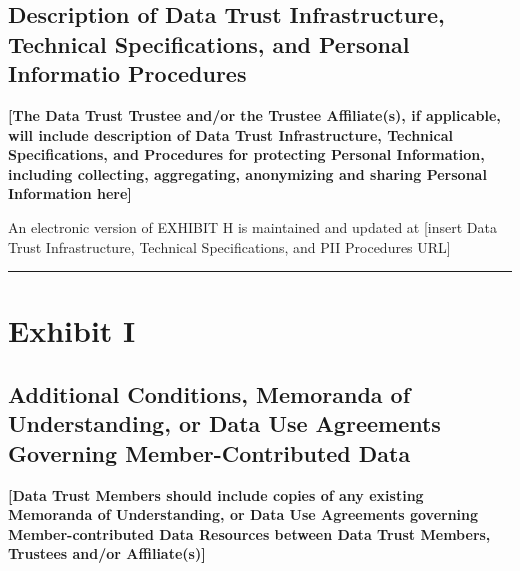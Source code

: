 \documentclass[]{book}
\begin{document}
\hypertarget{description-of-data-trust-infrastructure-technical-specifications-and-personal-informatio-procedures}{%
\section*{Description of Data Trust Infrastructure, Technical Specifications, and Personal Informatio Procedures}\label{description-of-data-trust-infrastructure-technical-specifications-and-personal-informatio-procedures}}

\textbf{{[}The Data Trust Trustee and/or the Trustee Affiliate(s), if applicable, will include description of Data Trust Infrastructure, Technical Specifications, and Procedures for protecting Personal Information, including collecting, aggregating, anonymizing and sharing Personal Information here{]}}

An electronic version of EXHIBIT H is maintained and updated at {[}insert Data Trust Infrastructure, Technical Specifications, and PII Procedures URL{]}

\begin{center}\rule{0.5\linewidth}{0.5pt}\end{center}

\hypertarget{exhibit-i}{%
\chapter*{Exhibit I}\label{exhibit-i}}

\hypertarget{additional-conditions-memoranda-of-understanding-or-data-use-agreements-governing-member-contributed-data}{%
\section*{Additional Conditions, Memoranda of Understanding, or Data Use Agreements Governing Member-Contributed Data}\label{additional-conditions-memoranda-of-understanding-or-data-use-agreements-governing-member-contributed-data}}

\textbf{{[}Data Trust Members should include copies of any existing Memoranda of Understanding, or Data Use Agreements governing Member-contributed Data Resources between Data Trust Members, Trustees and/or Affiliate(s){]}}
\end{document}
